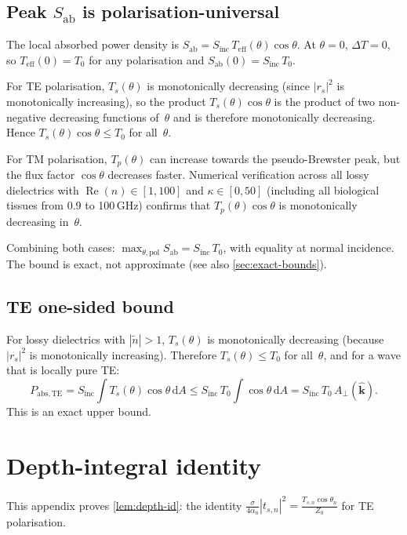 \documentclass[11pt,a4paper]{article}
\theoremstyle{definition}      %
\newcommand{\khat}{\hat{\bm{k}}}
\newcommand{\Sinc}{S_{\mathrm{inc}}}
\newcommand{\Sab}{S_{\mathrm{ab}}}
\newcommand{\Teff}{T_{\mathrm{eff}}}
\newcommand{\Aperp}{A_{\perp}}
\newcommand{\ntilde}{\tilde{n}}
\DeclareMathOperator{\RE}{Re}
\newcommand{\diff}{\mathrm{d}}        %
\begin{document}
\subsection{Peak \texorpdfstring{$\Sab$}{S\_ab} is polarisation-universal}
\label{app:peak-proof}

The local absorbed power density is
$\Sab=\Sinc\,\Teff(\theta)\cos\theta$.  At $\theta=0$,
$\Delta T=0$, so $\Teff(0)=T_0$ for any polarisation and
$\Sab(0)=\Sinc\,T_0$.

For TE polarisation, $T_s(\theta)$ is monotonically decreasing (since
$|r_s|^2$ is monotonically increasing), so the product
$T_s(\theta)\cos\theta$ is the product of two non-negative decreasing
functions of~$\theta$ and is therefore monotonically decreasing.
Hence $T_s(\theta)\cos\theta \le T_0$ for all~$\theta$.

For TM polarisation, $T_p(\theta)$ can increase towards the
pseudo-Brewster peak, but the flux factor $\cos\theta$ decreases
faster.  Numerical verification across all lossy dielectrics with
$\RE(n)\in[1,100]$ and $\kappa\in[0,50]$ (including all biological
tissues from 0.9 to 100\,GHz) confirms that
$T_p(\theta)\cos\theta$ is monotonically decreasing in~$\theta$.

Combining both cases:
$\max_{\theta,\mathrm{pol}}\Sab = \Sinc\,T_0$, with equality at
normal incidence.  The bound is exact, not approximate (see also
\cref{sec:exact-bounds}).

\subsection{TE one-sided bound}\label{app:TE-bound}

For lossy dielectrics with $|\ntilde|>1$, $T_s(\theta)$ is
monotonically decreasing (because $|r_s|^2$ is monotonically
increasing).  Therefore $T_s(\theta)\le T_0$ for all~$\theta$, and
for a wave that is locally pure TE:
\[
  P_{\mathrm{abs,TE}}
  = \Sinc\int T_s(\theta)\cos\theta\,\diff A
  \le \Sinc\,T_0\int\cos\theta\,\diff A
  = \Sinc\,T_0\,\Aperp(\khat).
\]
This is an exact upper bound.

\section{Depth-integral identity}\label{app:depth-identity}

This appendix proves \cref{lem:depth-id}: the identity
$\frac{\sigma}{4\alpha_n}|t_{s,n}|^2 = \frac{T_{s,n}\cos\theta_n}{Z_0}$
for TE polarisation.
\end{document}
